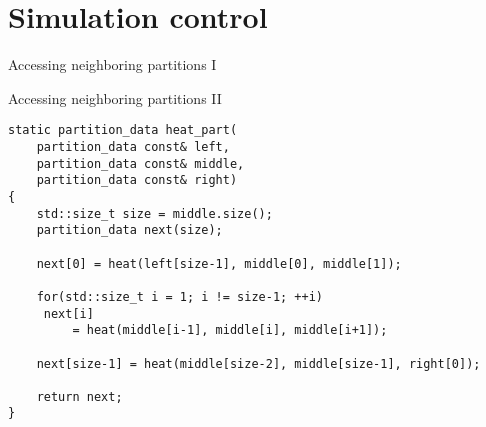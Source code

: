 \documentclass[\classoption]{beamer}
\begin{document}
\section{Simulation control}


\begin{frame}{Accessing neighboring partitions I}

\begin{center}
\end{center}
\end{frame}


\begin{frame}[fragile]{Accessing neighboring partitions II}
\vspace{-0.5cm}
\begin{lstlisting}
static partition_data heat_part(
    partition_data const& left,
    partition_data const& middle, 
    partition_data const& right)
{
    std::size_t size = middle.size();
    partition_data next(size);

    next[0] = heat(left[size-1], middle[0], middle[1]);

    for(std::size_t i = 1; i != size-1; ++i)
     next[i] 
         = heat(middle[i-1], middle[i], middle[i+1]);

    next[size-1] = heat(middle[size-2], middle[size-1], right[0]);

    return next;
}
\end{lstlisting}
\end{frame}
\end{document}

